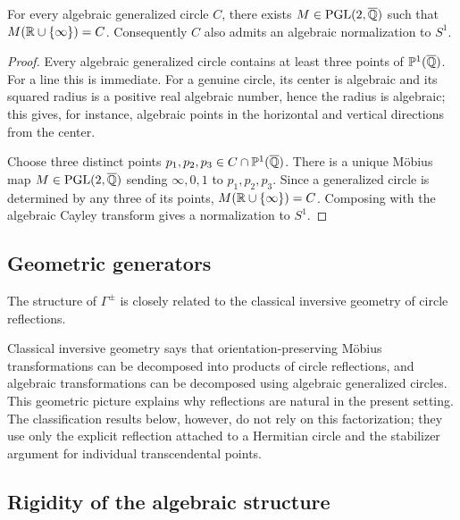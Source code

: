 \begin{lemma}\label{grct:lem:circle-normalization}
	For every algebraic generalized circle $C$, there exists $M\in\operatorname{PGL}(2,\overline{\mathbb{Q}})$ such that $M(\mathbb{R}\cup\{\infty\})=C$. Consequently $C$ also admits an algebraic normalization to $S^1$.
\end{lemma}
\begin{proof}
	Every algebraic generalized circle contains at least three points of $\mathbb{P}^{1}(\overline{\mathbb{Q}})$. For a line this is immediate. For a genuine circle, its center is algebraic and its squared radius is a positive real algebraic number, hence the radius is algebraic; this gives, for instance, algebraic points in the horizontal and vertical directions from the center.
	
	Choose three distinct points $p_1,p_2,p_3\in C\cap\mathbb{P}^{1}(\overline{\mathbb{Q}})$. There is a unique Möbius map $M\in\operatorname{PGL}(2,\overline{\mathbb{Q}})$ sending $\infty,0,1$ to $p_1,p_2,p_3$. Since a generalized circle is determined by any three of its points, $M(\mathbb{R}\cup\{\infty\})=C$. Composing with the algebraic Cayley transform gives a normalization to $S^1$.
\end{proof}

\subsection{Geometric generators}\label{grct:subsec:inversive-input}

The structure of $\Gamma^{\pm}$ is closely related to the classical inversive geometry of circle reflections.

\begin{remark}\label{grct:rem:two-reflections}
	Classical inversive geometry says that orientation-preserving Möbius transformations can be decomposed into products of circle reflections, and algebraic transformations can be decomposed using algebraic generalized circles. This geometric picture explains why reflections are natural in the present setting. The classification results below, however, do not rely on this factorization; they use only the explicit reflection attached to a Hermitian circle and the stabilizer argument for individual transcendental points.
\end{remark}

\subsection{Rigidity of the algebraic structure}\label{grct:subsec:max-transfer}

